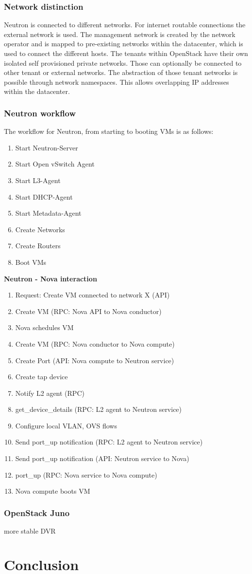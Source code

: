 \subsubsection{Network distinction}

Neutron is connected to different networks. For internet routable connections the external network is used. The management network is created by the network operator and is mapped to pre-existing networks within the datacenter, which is used to connect the different hosts. The tenants within OpenStack have their own isolated self provisioned private networks. Those can optionally be connected to other tenant or external networks. The abstraction of those tenant networks is possible through network namespaces. This allows overlapping IP addresses within the datacenter.


\subsubsection{Neutron workflow}

The workflow for Neutron, from starting to booting VMs is as follows:
\begin{enumerate}
\item Start Neutron-Server
\item Start Open vSwitch Agent
\item Start L3-Agent
\item Start DHCP-Agent
\item Start Metadata-Agent
\item Create Networks
\item Create Routers
\item Boot VMs
\end{enumerate}


\textbf{Neutron - Nova interaction}

\begin{enumerate}
\item Request: Create VM connected to network X (API)
\item Create VM (RPC: Nova API to Nova conductor)
\item Nova schedules VM
\item Create VM (RPC: Nova conductor to Nova compute)
\item Create Port (API: Nova compute to Neutron service)
\item Create tap device
\item Notify L2 agent (RPC)
\item get\_device\_details (RPC: L2 agent to Neutron service)
\item Configure local VLAN, OVS flows
\item Send port\_up notification (RPC: L2 agent to Neutron service)
\item Send port\_up notification (API: Neutron service to Nova)
\item port\_up (RPC: Nova service to Nova compute)
\item Nova compute boots VM

\end{enumerate}

\subsubsection{OpenStack Juno}

more stable
DVR

\section{Conclusion}